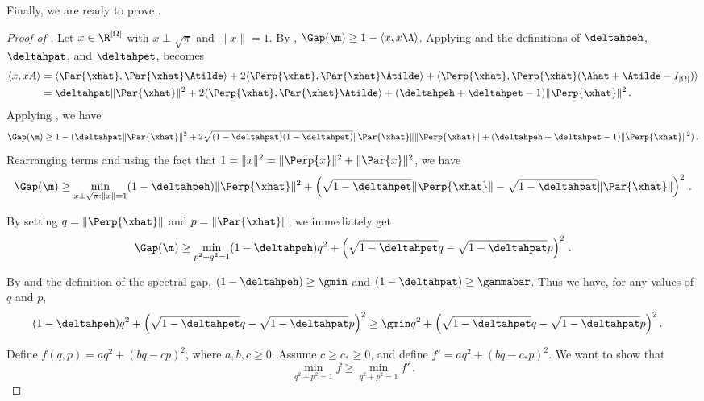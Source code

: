 Finally, we are ready to prove . 

%
%
%
\begin{proof}[Proof of ]
Let $x\in \R^{|\Omega|}$ with $x\perp \sqrt{\pi}$ and $\|x\|=1$.  By , 
$\Gap(\m) \geq 1-\langle x,x\A\rangle$.  
Applying  and the definitions of $\deltahpeh$, $\deltahpat$,
and $\deltahpet$,  becomes
\begin{align}
 \langle {x},{x}A\rangle&=  \langle \Par{\xhat},\Par{\xhat}\Atilde\rangle +2
  \langle\Perp{\xhat},\Par{\xhat}\Atilde\rangle
  +\langle\Perp{\xhat},\Perp{\xhat}(\Ahat+\Atilde-I_{|\Omega|})\rangle\nonumber\\
  &= \deltahpat \|\Par{\xhat}\|^2 +2 \langle\Perp{\xhat},\Par{\xhat}\Atilde\rangle
  +(\deltahpeh +\deltahpet -1)\|\Perp{\xhat}\|^2\,.\label{eq:strongestbound}
\end{align}
Applying , we have
\[ \Gap(\m) \geq 1 - (\deltahpat \|\Par{\xhat}\|^2 + 
2 \sqrt{(1-\deltahpat)(1-\deltahpet)}\|\Par{\xhat}\|\|\Perp{\xhat}\|
+(\deltahpeh +\deltahpet -1)\|\Perp{\xhat}\|^2)\,.
\]
Rearranging terms and using the fact that
$1=\|x\|^2=\|\Perp{x}\|^2+\|\Par{x}\|^2$, we have
\begin{equation}\label{eq:main}
\Gap(\m) \geq \min_{x\perp\sqrt{\pi}:\|x\|=1} 
(1-\deltahpeh)\|\Perp{\xhat}\|^2+\left(\sqrt{1-\deltahpet}\|\Perp{\xhat}\| - \sqrt{1-\deltahpat}\|\Par{\xhat}\|\right)^2\,.
\end{equation}

By setting $q=\|\Perp{\xhat}\|$ and $p=\|\Par{\xhat}\|$, we immediately get
\[\Gap(\m) \geq \min_{p^2+q^2=1} 
(1-\deltahpeh)q^2+\left(\sqrt{1-\deltahpet}q - \sqrt{1-\deltahpat}p\right)^2\,.\] 


By  and the definition of the spectral gap, $(1-\deltahpeh)\geq \gmin$ and
 $(1-\deltahpat)\geq \gammabar$.   Thus we have, for any values of $q$ and $p$, 
\begin{align*}
(1-\deltahpeh)q^2+\left(\sqrt{1-\deltahpet}q - \sqrt{1-\deltahpat}p\right)^2
&\geq \gmin q^2+\left(\sqrt{1-\deltahpet}q - \sqrt{1-\deltahpat}p\right)^2.
\end{align*}


Define $f(q,p) = a q^2 + (bq-cp)^2$, where $a,b,c\geq 0$.  Assume $c\geq c_*\geq 0$, and define $f'= a q^2 + (bq-c_*p)^2$.  We want to show that
\begin{equation}\label{eq:lowerbound}
 \min_{q^2+p^2=1} f \geq  \min_{q^2+p^2=1} f'\,.
\end{equation}


\end{proof}
